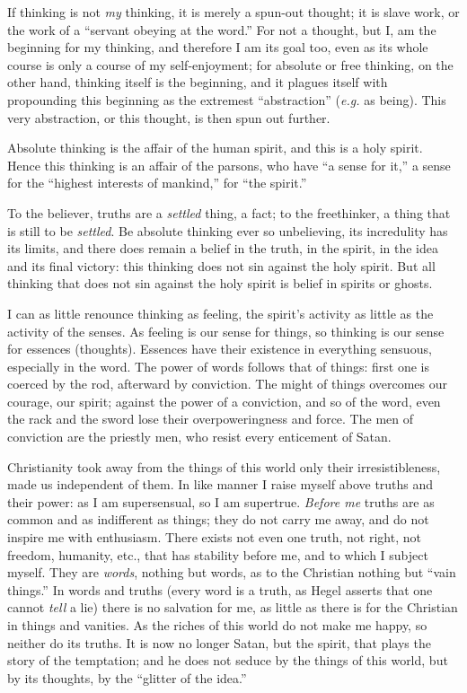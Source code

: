 \documentclass[12pt,a4paper]{book}
\begin{document}
If thinking is not \textit{my} thinking, it is merely a spun-out thought; it 
is slave work, or the work of a ``servant obeying at the word.'' For not a 
thought, but I, am the beginning for my thinking, and therefore I am its goal 
too, even as its whole course is only a course of my self-enjoyment; for 
absolute or free thinking, on the other hand, thinking itself is the 
beginning, and it plagues itself with propounding this beginning as the 
extremest ``abstraction'' (\textit{e.g.} as being). This very abstraction, 
or this thought, is then spun out further.

Absolute thinking is the affair of the human spirit, and this is a holy 
spirit. Hence this thinking is an affair of the parsons, who have ``a sense 
for it,'' a sense for the ``highest interests of mankind,'' for ``the 
spirit.''

To the believer, truths are a \textit{settled} thing, a fact; to the 
freethinker, a thing that is still to be \textit{settled}. Be absolute 
thinking ever so unbelieving, its incredulity has its limits, and there does 
remain a belief in the truth, in the spirit, in the idea and its final 
victory: this thinking does not sin against the holy spirit. But all thinking 
that does not sin against the holy spirit is belief in spirits or ghosts.

I can as little renounce thinking as feeling, the spirit's activity as little 
as the activity of the senses. As feeling is our sense for things, so thinking 
is our sense for essences (thoughts). Essences have their existence in 
everything sensuous, especially in the word. The power of words follows that 
of things: first one is coerced by the rod, afterward by conviction. The might 
of things overcomes our courage, our spirit; against the power of a 
conviction, and so of the word, even the rack and the sword lose their 
overpoweringness and force. The men of conviction are the priestly men, who 
resist every enticement of Satan.

Christianity took away from the things of this world only their 
irresistibleness, made us independent of them. In like manner I raise myself 
above truths and their power: as I am supersensual, so I am supertrue. 
\textit{Before me} truths are as common and as indifferent as things; they do 
not carry me away, and do not inspire me with enthusiasm. There exists not 
even one truth, not right, not freedom, humanity, etc., that has stability 
before me, and to which I subject myself. They are \textit{words}, nothing but 
words, as to the Christian nothing but ``vain things.'' In words and truths 
(every word is a truth, as Hegel asserts that one cannot \textit{tell} a lie) 
there is no salvation for me, as little as there is for the Christian in 
things and vanities. As the riches of this world do not make me happy, so 
neither do its truths. It is now no longer Satan, but the spirit, that plays 
the story of the temptation; and he does not seduce by the things of this 
world, but by its thoughts, by the ``glitter of the idea.''
\end{document}
